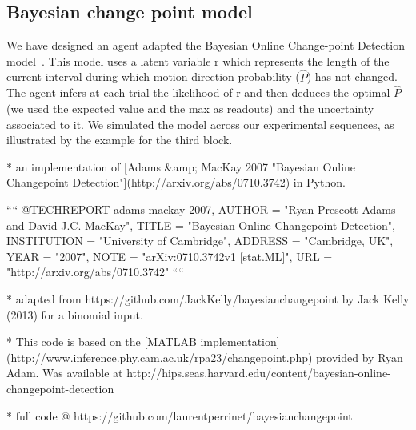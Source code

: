 \documentclass[profile,final,english, draft]{article}%
\begin{document}
\subsection{Bayesian change point model}

We have designed an agent adapted the Bayesian Online Change-point Detection model~\parencite{AdamsMackay2007}. This model uses a latent variable r which represents the length of the current interval during which motion-direction probability ($\hat{P}$) has not changed. The agent infers at each trial the likelihood  of r and then deduces the optimal $\hat{P}$ (we used the expected value and the max as readouts) and the uncertainty associated to it. We simulated the model across our experimental sequences, as illustrated by the example for the third block.


* an implementation of
[Adams &amp; MacKay 2007 "Bayesian Online Changepoint Detection"](http://arxiv.org/abs/0710.3742)
in Python.

````
@TECHREPORT{ adams-mackay-2007,
AUTHOR = "Ryan Prescott Adams and David J.C. MacKay",
TITLE  = "Bayesian Online Changepoint Detection",
INSTITUTION = "University of Cambridge",
ADDRESS = "Cambridge, UK",
YEAR = "2007",
NOTE = "arXiv:0710.3742v1 [stat.ML]",
URL = "http://arxiv.org/abs/0710.3742"
}
````

* adapted from https://github.com/JackKelly/bayesianchangepoint by Jack Kelly (2013) for a binomial input.

* This code is based on the  [MATLAB implementation](http://www.inference.phy.cam.ac.uk/rpa23/changepoint.php) provided by Ryan Adam. Was available at http://hips.seas.harvard.edu/content/bayesian-online-changepoint-detection

 * full code @ https://github.com/laurentperrinet/bayesianchangepoint
\end{document}

